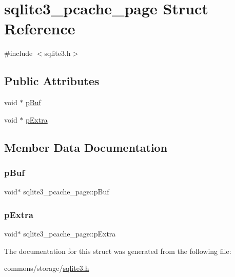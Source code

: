 \hypertarget{structsqlite3__pcache__page}{}\section{sqlite3\+\_\+pcache\+\_\+page Struct Reference}
\label{structsqlite3__pcache__page}


{\ttfamily \#include $<$sqlite3.\+h$>$}

\subsection*{Public Attributes}
\begin{DoxyCompactItemize}
\item 
void $\ast$ \mbox{\hyperlink{structsqlite3__pcache__page_a19aa6f5638fe2d4eee32aed37a119288}{p\+Buf}}
\item 
void $\ast$ \mbox{\hyperlink{structsqlite3__pcache__page_a6356a15fc426a7558ddf34038f70a65f}{p\+Extra}}
\end{DoxyCompactItemize}


\subsection{Member Data Documentation}
\mbox{\label{structsqlite3__pcache__page_a19aa6f5638fe2d4eee32aed37a119288}} 
\subsubsection{\texorpdfstring{pBuf}{pBuf}}
{\footnotesize\ttfamily void$\ast$ sqlite3\+\_\+pcache\+\_\+page\+::p\+Buf}

\mbox{\label{structsqlite3__pcache__page_a6356a15fc426a7558ddf34038f70a65f}} 
\subsubsection{\texorpdfstring{pExtra}{pExtra}}
{\footnotesize\ttfamily void$\ast$ sqlite3\+\_\+pcache\+\_\+page\+::p\+Extra}



The documentation for this struct was generated from the following file\+:\begin{DoxyCompactItemize}
\item 
commons/storage/\mbox{\hyperlink{sqlite3_8h}{sqlite3.\+h}}\end{DoxyCompactItemize}
